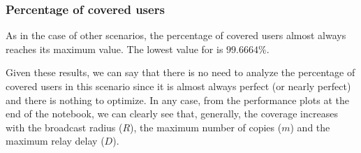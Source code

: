 \subsubsection{Percentage of covered users}\label{subsubsec:rect2krcoverage}

As in the case of other scenarios, the percentage of covered users almost always
reaches its maximum value. The lowest value for is \(99.6664\%\).

Given these results, we can say that there is no need to analyze the percentage
of covered users in this scenario since it is almost always perfect (or nearly
perfect) and there is nothing to optimize. In any case, from the performance
plots at the end of the notebook, we can clearly see that, generally, the
coverage increases with the broadcast radius (\(R\)), the maximum number of
copies (\(m\)) and the maximum relay delay (\(D\)).
